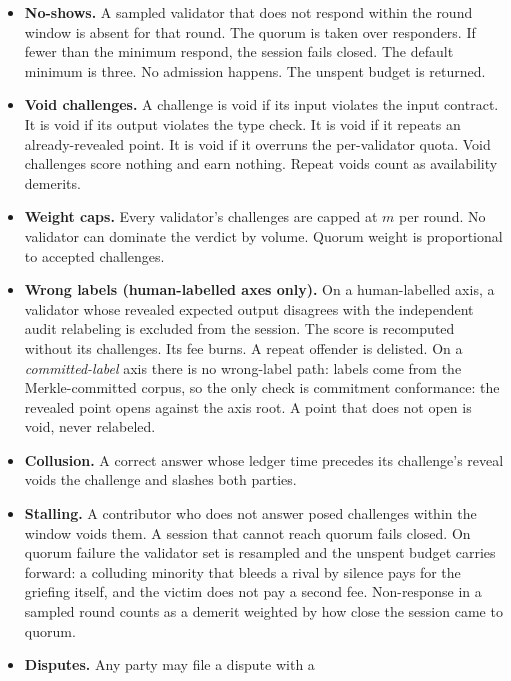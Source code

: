\documentclass[11pt]{article}
\begin{document}
\begin{itemize}
    \item \textbf{No-shows.} A sampled validator that does not respond
          within the round window is absent for that round. The quorum is
          taken over responders. If fewer than the minimum respond, the
          session fails closed. The default minimum is three. No admission
          happens. The unspent budget is returned.
    \item \textbf{Void challenges.} A challenge is void if its input
          violates the input contract. It is void if its output violates
          the type check. It is void if it repeats an already-revealed
          point. It is void if it overruns the per-validator quota. Void
          challenges score nothing and earn nothing. Repeat voids count as
          availability demerits.
    \item \textbf{Weight caps.} Every validator's challenges are
          capped at $m$ per round. No validator can dominate the verdict by
          volume. Quorum weight is proportional to accepted challenges.
    \item \textbf{Wrong labels (human-labelled axes only).} On a
          human-labelled axis, a validator whose revealed expected
          output disagrees with the independent audit relabeling is
          excluded from the session. The score is recomputed without its
          challenges. Its fee burns. A repeat offender is delisted. On a
          \emph{committed-label} axis there is no wrong-label path: labels
          come from the Merkle-committed corpus, so the only check is
          commitment conformance: the revealed point opens against the
          axis root. A point that does not open is void, never
          relabeled.
    \item \textbf{Collusion.} A correct answer whose ledger time
          precedes its challenge's reveal voids the challenge and slashes
          both parties.
    \item \textbf{Stalling.} A contributor who does not answer posed
          challenges within the window voids them. A session that cannot
          reach quorum fails closed. On quorum failure the validator set is
          resampled and the unspent budget carries forward: a colluding
          minority that bleeds a rival by silence pays for the griefing
          itself, and the victim does not pay a second fee. Non-response in
          a sampled round counts as a demerit weighted by how close the
          session came to quorum.
    \item \textbf{Disputes.} Any party may file a dispute with a

\end{itemize}
\end{document}
